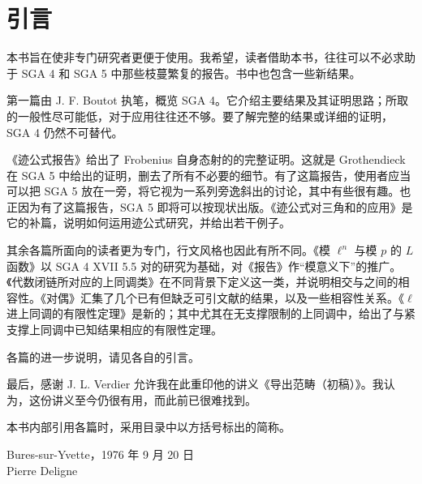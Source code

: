 \chapter*{引言}
本书旨在使非专门研究者更便于使用。我希望，读者借助本书，往往可以不必求助于 SGA 4 和 SGA 5 中那些枝蔓繁复的报告。书中也包含一些新结果。

第一篇由 J. F. Boutot 执笔，概览 SGA 4。它介绍主要结果及其证明思路；所取的一般性尽可能低，对于应用往往还不够。要了解完整的结果或详细的证明，SGA 4 仍然不可替代。

《迹公式报告》给出了 Frobenius 自身态射的的完整证明。这就是 Grothendieck 在 SGA 5 中给出的证明，删去了所有不必要的细节。有了这篇报告，使用者应当可以把 SGA 5 放在一旁，将它视为一系列旁逸斜出的讨论，其中有些很有趣。也正因为有了这篇报告，SGA 5 即将可以按现状出版。《迹公式对三角和的应用》是它的补篇，说明如何运用迹公式研究，并给出若干例子。

其余各篇所面向的读者更为专门，行文风格也因此有所不同。《模 $\ell^n$ 与模 $p$ 的 $L$ 函数》以 SGA 4 XVII 5.5 对的研究为基础，对《报告》作“模意义下”的推广。《代数闭链所对应的上同调类》在不同背景下定义这一类，并说明相交与之间的相容性。《对偶》汇集了几个已有但缺乏可引文献的结果，以及一些相容性关系。《$\ell$ 进上同调的有限性定理》是新的；其中尤其在无支撑限制的上同调中，给出了与紧支撑上同调中已知结果相应的有限性定理。

各篇的进一步说明，请见各自的引言。

最后，感谢 J. L. Verdier 允许我在此重印他的讲义《导出范畴（初稿）》。我认为，这份讲义至今仍很有用，而此前已很难找到。

本书内部引用各篇时，采用目录中以方括号标出的简称。

\vspace{8mm}
\begin{flushright}
Bures-sur-Yvette，1976 年 9 月 20 日\\[4mm]
Pierre Deligne
\end{flushright}

\clearpage
